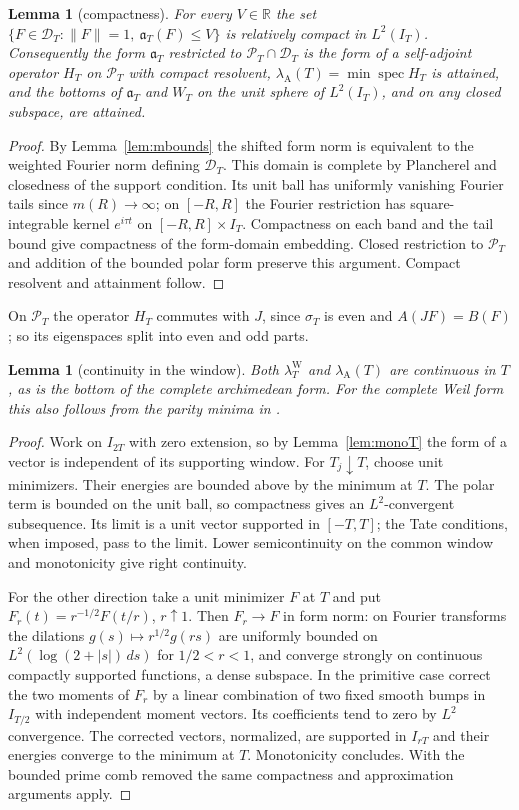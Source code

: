 \documentclass[10pt]{amsart}
\newtheorem{lemma}[theorem]{Lemma}
\theoremstyle{definition}
\theoremstyle{remark}
\newcommand{\R}{\mathbb R}
\newcommand{\PT}{\mathcal P_T}
\newcommand{\IT}{I_T}
\newcommand{\lamW}{\lambda^{\mathrm W}_T}
\newcommand{\lamA}{\lambda_{\mathrm A}(T)}
\newcommand{\sT}{\sigma_T}
\begin{document}
\begin{lemma}[compactness]\label{lem:compact}
For every $V\in\R$ the set $\{F\in\mathcal D_T:\|F\|=1,\ \mathfrak a_T(F)\le V\}$ is relatively compact in
$L^2(\IT)$. Consequently the form $\mathfrak a_T$ restricted to $\PT\cap\mathcal D_T$ is the form of a
self-adjoint operator $H_T$ on $\PT$ with compact resolvent, $\lamA=\min\operatorname{spec}H_T$ is attained,
and the bottoms of $\mathfrak a_T$ and $W_T$ on the unit sphere of $L^2(\IT)$, and on any closed subspace, are
attained.
\end{lemma}
\begin{proof}
By Lemma~\ref{lem:mbounds} the shifted form norm is equivalent to the
weighted Fourier norm defining $\mathcal D_T$. This domain is complete
by Plancherel and closedness of the support condition. Its unit ball
has uniformly vanishing Fourier tails since $m(R)\to\infty$; on
$[-R,R]$ the Fourier restriction has square-integrable kernel
$e^{i\tau t}$ on $[-R,R]\times\IT$. Compactness on each band and
the tail bound give compactness of the form-domain embedding.
Closed restriction to $\PT$ and addition of the bounded polar form
preserve this argument. Compact resolvent and attainment follow.
\end{proof}

On $\PT$ the operator $H_T$ commutes with $J$, since $\sT$ is even and $A(JF)=B(F)$; so its eigenspaces
split into even and odd parts.

\begin{lemma}[continuity in the window]\label{lem:contT}\label{lem:contA}
Both $\lamW$ and $\lamA$ are continuous in $T$, as is the bottom
of the complete archimedean form. For the complete Weil form this
also follows from the parity minima in \cite[Thm.~5]{Bombieri2000}.
\end{lemma}
\begin{proof}
Work on $I_{2T}$ with zero extension, so by Lemma~\ref{lem:monoT}
the form of a vector is independent of its supporting window.
For $T_j\downarrow T$, choose unit minimizers. Their energies are
bounded above by the minimum at $T$. The polar term is bounded on the
unit ball, so compactness gives an $L^2$-convergent subsequence.
Its limit is a unit vector supported in $[-T,T]$; the Tate conditions,
when imposed, pass to the limit. Lower semicontinuity on the common
window and monotonicity give right continuity.

For the other direction take a unit minimizer $F$ at $T$ and put
$F_r(t)=r^{-1/2}F(t/r)$, $r\uparrow1$. Then $F_r\to F$ in form norm:
on Fourier transforms the dilations $g(s)\mapsto r^{1/2}g(rs)$
are uniformly bounded on $L^2(\log(2+|s|)\,ds)$ for $1/2<r<1$,
and converge strongly on continuous compactly supported functions,
a dense subspace. In the primitive case correct the two moments
of $F_r$ by a linear combination of two fixed smooth bumps in
$I_{T/2}$ with independent moment vectors. Its coefficients tend
to zero by $L^2$ convergence. The corrected vectors, normalized,
are supported in $I_{rT}$ and their energies converge to the minimum
at $T$. Monotonicity concludes. With the bounded prime comb removed
the same compactness and approximation arguments apply.
\end{proof}
\end{document}
